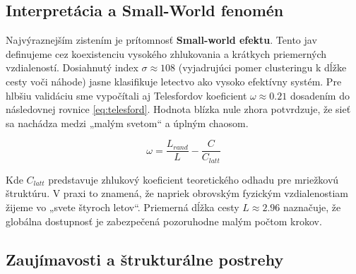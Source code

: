 \subsection*{Interpretácia a Small-World fenomén}

Najvýraznejším zistením je prítomnosť \textbf{Small-world efektu}. Tento jav definujeme cez koexistenciu vysokého zhlukovania a krátkych priemerných
vzdialeností. Dosiahnutý index \textbf{$\sigma \approx 108$} (vyjadrujúci pomer clusteringu k dĺžke cesty voči náhode) jasne klasifikuje letectvo ako
vysoko efektívny systém. Pre hlbšiu validáciu sme vypočítali aj Telesfordov koeficient \textbf{$\omega \approx 0.21$} dosadením do následovnej rovnice
\ref{eq:telesford}. Hodnota blízka nule zhora potvrdzuje, že sieť sa nachádza medzi „malým svetom“ a úplným chaosom. 

\begin{equation}
\omega = \frac{L_{rand}}{L} - \frac{C}{C_{latt}}
\label{eq:telesford}
\end{equation}

Kde $C_{latt}$ predstavuje zhlukový koeficient teoretického odhadu pre mriežkovú štruktúru. V praxi to znamená, že napriek obrovským fyzickým
vzdialenostiam žijeme vo „svete štyroch letov“. Priemerná dĺžka cesty $L \approx 2.96$ naznačuje, že globálna dostupnosť je zabezpečená pozoruhodne
malým počtom krokov.

\subsection*{Zaujímavosti a štrukturálne postrehy}

